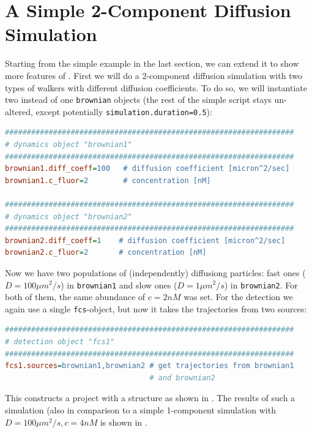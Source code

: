 \section{A Simple 2-Component Diffusion Simulation}
\label{sec:ASImple2ComponentDiffusionSimulation}
Starting from the simple example in the last section, we can extend it to show more features of \df. First we will do a 2-component diffusion simulation with two types of walkers with different diffusion coefficients. To do so, we will instantiate two instead of one \texttt{brownian} objects (the rest of the simple script stays un-altered, except potentially \texttt{simulation.duration=0.5}):
\begin{lstlisting}[language=INI] 
##################################################################
# dynamics object "brownian1"
##################################################################
brownian1.diff_coeff=100   # diffusion coefficient [micron^2/sec]
brownian1.c_fluor=2        # concentration [nM]

##################################################################
# dynamics object "brownian2"
##################################################################
brownian2.diff_coeff=1    # diffusion coefficient [micron^2/sec]
brownian2.c_fluor=2       # concentration [nM]
\end{lstlisting}
Now we have two populations of (independently) diffusiong particles: fast ones ($D=100\unit{\mu m^2/s}$) in \texttt{brownian1} and slow ones ($D=1\unit{\mu m^2/s}$) in \texttt{brownian2}. For both of them, the same abundance of $c=2\unit{nM}$ was set.
For the detection we again use a single \texttt{fcs}-object, but now it takes the trajectories from two sources:
\begin{lstlisting}[language=INI] 
##################################################################
# detection object "fcs1"
##################################################################
fcs1.sources=brownian1,brownian2 # get trajectories from brownian1
                                 # and brownian2
\end{lstlisting}
This constructs a project with a structure as shown in .
The results of such a simulation (also in comparison to a simple 1-component simulation with $D=100\unit{\mu m^2/s}, c=4\unit{nM}$ is shown in .

